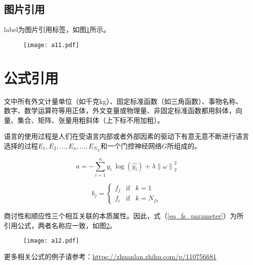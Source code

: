 \documentclass{standalone}
\begin{document}
\subsection{图片引用}
label为图片引用标签，如图\ref{fig_20}所示。
\begin{figure}[htbp]
	\centering
	\texttt{[image: a11.pdf]}
	\label{fig_20}
\end{figure}



\section{公式引用}\label{sec_face_landmark}
 
 文中所有外文计量单位（如千克kg）、固定标准函数（如三角函数）、事物名称、数字、数学运算符等用正体，外文变量或物理量、非固定标准函数都用斜体，向量、集合、矩阵、张量用粗斜体（上下标不用加粗）。

语言的使用过程是人们在受语言内部或者外部因素的驱动下有意无意不断进行语言选择的过程$E_1, E_2, \dots,E_n, \dots, E_{N_E}$和一个门控神经网络$G$所组成的。

\begin{equation}
	a = - \sum_{i=1}^{n}{y_i\:\log(\hat{y_i})} +     \label{eq:0}
	\lambda {\left\lVert\omega\right\rVert}_2^2
\end{equation}


\begin{equation}\label{eq_fs_parameter}
	b_{j} = \left\{\begin{array}{lcl}
		f_{j} & \text{if} & k=1\\ 
		f_{i} & \text{if} & k=N_{fs}
	\end{array}\right.
\end{equation}


商讨性和顺应性三个相互关联的本质属性。因此，式（\ref{eq_fs_parameter}）为所引用公式，两者名称应一致，如图\ref{fig_11}。

\begin{figure}[htbp]
	\centering
	\texttt{[image: a12.pdf]}
	\label{fig_11}
\end{figure}

更多相关公式的例子请参考：\href{https://zhuanlan.zhihu.com/p/110756681}{https://zhuanlan.zhihu.com/p/110756681}
\end{document}
